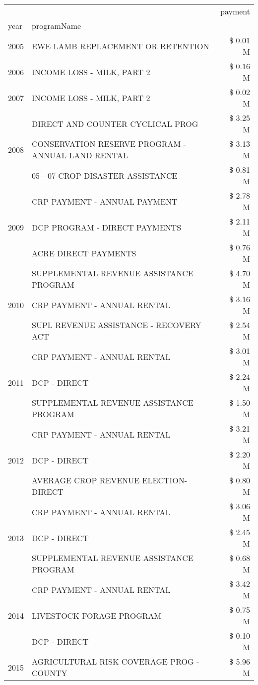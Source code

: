 \begin{tabular}{llr}
\toprule
 &  & payment \\
year & programName &  \\
\midrule
2005 & EWE LAMB REPLACEMENT OR RETENTION & \$ 0.01 M \\
\cline{1-3}
2006 & INCOME LOSS - MILK, PART 2 & \$ 0.16 M \\
\cline{1-3}
2007 & INCOME LOSS - MILK, PART 2 & \$ 0.02 M \\
\cline{1-3}
\multirow[t]{3}{*}{2008} & DIRECT AND COUNTER CYCLICAL PROG & \$ 3.25 M \\
 & CONSERVATION RESERVE PROGRAM - ANNUAL LAND RENTAL & \$ 3.13 M \\
 & 05 - 07 CROP DISASTER ASSISTANCE & \$ 0.81 M \\
\cline{1-3}
\multirow[t]{3}{*}{2009} & CRP PAYMENT - ANNUAL PAYMENT & \$ 2.78 M \\
 & DCP PROGRAM - DIRECT PAYMENTS & \$ 2.11 M \\
 & ACRE DIRECT PAYMENTS & \$ 0.76 M \\
\cline{1-3}
\multirow[t]{3}{*}{2010} & SUPPLEMENTAL REVENUE ASSISTANCE PROGRAM & \$ 4.70 M \\
 & CRP PAYMENT - ANNUAL RENTAL & \$ 3.16 M \\
 & SUPL REVENUE ASSISTANCE - RECOVERY ACT & \$ 2.54 M \\
\cline{1-3}
\multirow[t]{3}{*}{2011} & CRP PAYMENT - ANNUAL RENTAL & \$ 3.01 M \\
 & DCP - DIRECT & \$ 2.24 M \\
 & SUPPLEMENTAL REVENUE ASSISTANCE PROGRAM & \$ 1.50 M \\
\cline{1-3}
\multirow[t]{3}{*}{2012} & CRP PAYMENT - ANNUAL RENTAL & \$ 3.21 M \\
 & DCP - DIRECT & \$ 2.20 M \\
 & AVERAGE CROP REVENUE ELECTION-DIRECT & \$ 0.80 M \\
\cline{1-3}
\multirow[t]{3}{*}{2013} & CRP PAYMENT - ANNUAL RENTAL & \$ 3.06 M \\
 & DCP - DIRECT & \$ 2.45 M \\
 & SUPPLEMENTAL REVENUE ASSISTANCE PROGRAM & \$ 0.68 M \\
\cline{1-3}
\multirow[t]{3}{*}{2014} & CRP PAYMENT - ANNUAL RENTAL & \$ 3.42 M \\
 & LIVESTOCK FORAGE PROGRAM & \$ 0.75 M \\
 & DCP - DIRECT & \$ 0.10 M \\
\cline{1-3}
\multirow[t]{3}{*}{2015} & AGRICULTURAL RISK COVERAGE PROG - COUNTY & \$ 5.96 M \\

\end{tabular}
